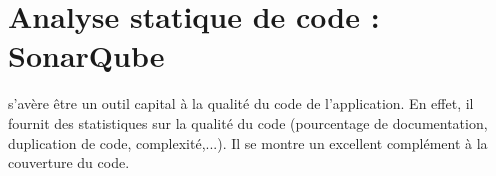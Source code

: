 \section{Analyse statique de code : SonarQube}
 s'avère être un outil capital à la qualité du code de l'application. En effet, il fournit des statistiques sur la qualité du code (pourcentage de documentation, duplication de code, complexité,...). Il se montre un excellent complément à la couverture du code.  